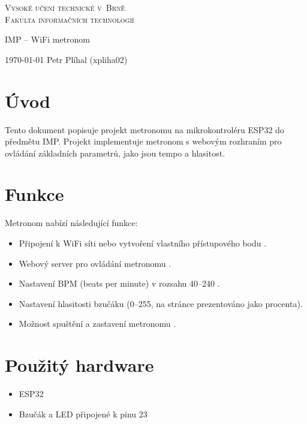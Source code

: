 \documentclass[a4paper, 11pt]{article}
\begin{document}
    
\begin{titlepage}
    \begin{center}
        \textsc{
            {\Huge 
                Vysoké učení technické v~Brně \\ \vspace{0.5em}
            }
            {\huge
                Fakulta informačních technologií
            }
        }
        \\
        {\LARGE
            IMP -- WiFi metronom \\  \vspace{0.6em}
            
        }
        
    \end{center}

    {\Large
        \today
        \hfill
        Petr Plíhal (xpliha02)
    }
\end{titlepage}
\tableofcontents
\newpage

\section{Úvod}
Tento dokument popisuje projekt metronomu na mikrokontroléru ESP32 do předmětu IMP. Projekt implementuje metronom s webovým rozhraním pro ovládání základních parametrů, jako jsou tempo a hlasitost.

\section{Funkce}
Metronom nabízí následující funkce:
\begin{itemize}
    \item Připojení k WiFi síti nebo vytvoření vlastního přístupového bodu \cite{platformio_board}.
    \item Webový server pro ovládání metronomu \cite{esp32_manual}.
    \item Nastavení BPM (beats per minute) v rozsahu 40--240 \cite{esp32_datasheet}.
    \item Nastavení hlasitosti bzučáku (0--255, na stránce prezentováno jako procenta).
    \item Možnost spuštění a zastavení metronomu \cite{d1_r32_manual}.
\end{itemize}

\section{Použitý hardware}
\begin{itemize}
    \item ESP32 \cite{esp32_datasheet}
    \item Bzučák a LED připojené k pinu 23
\end{itemize}
\end{document}

